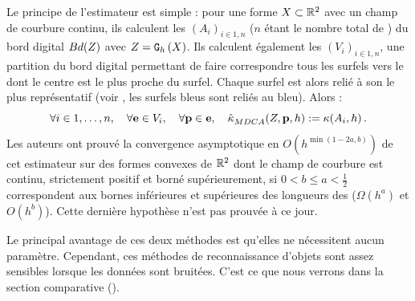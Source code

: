 Le principe de l'estimateur est simple : pour une forme $X \subset \mathbb{R}^2$
avec un champ de courbure continu, ils calculent les $(A_i)_{i \in 1,n}$ \MDCA
($n$ étant le nombre total de \MDCA) du bord digital $Bd({Z})$ avec
$Z = \mathtt{G}_{h}\left(X\right)$. Ils calculent également les $(V_i)_{i \in 1,n}$, une
partition du bord digital permettant de faire correspondre tous les surfels vers
le \MDCA dont le centre est le plus proche du surfel. Chaque surfel est alors relié à son \MDCA le plus
représentatif (voir , les surfels bleus sont
reliés au \MDCA bleu). Alors :
%
\begin{equation}
    \forall i \in 1,\dotsc,n, \quad \forall \mathbf{e} \in V_i, \quad \forall \mathbf{p} \in \mathbf{e},
    \quad \hat{\kappa}^{}_{MDCA}(Z,\mathbf{p},h) := \kappa(A_i,h) \,.
\end{equation}
%
Les auteurs ont prouvé la convergence asymptotique en $O(h^{\min(1-2a,b)})$ de
cet estimateur sur des formes convexes de $\mathbb{R}^2$ dont le champ de courbure est
continu, strictement positif et borné supérieurement, si $0 < b \le a <
\frac{1}{2}$ correspondent aux bornes inférieures et supérieures des longueurs des
\MDCA (\respp $\Omega(h^a)$ et $O(h^b)$). Cette dernière hypothèse n'est pas
prouvée à ce jour.


Le principal avantage de ces deux méthodes est qu'elles ne nécessitent aucun
paramètre. Cependant, ces méthodes de reconnaissance d'objets sont assez
sensibles lorsque les données sont bruitées. C'est ce que nous verrons dans la
section comparative ().
%
